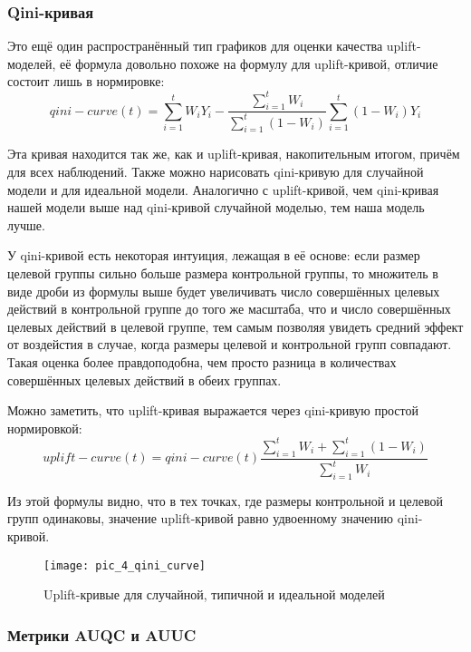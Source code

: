 \subsubsection*{Qini-кривая}

Это ещё один распространённый тип графиков для оценки качества uplift-моделей, её формула довольно похоже на формулу для uplift-кривой, отличие состоит лишь в нормировке:
$$
    qini-curve(t) =
        \sum\limits_{i=1}^{t} W_i Y_i
        - 
        \frac{
            \sum\limits_{i=1}^{t} W_i
        }{
            \sum\limits_{i=1}^{t} (1 - W_i)
        }
        \sum\limits_{i=1}^{t} (1 - W_i) Y_i
$$

Эта кривая находится так же, как и uplift-кривая, накопительным итогом, причём для всех наблюдений. Также можно нарисовать qini-кривую для случайной модели и для идеальной модели. Аналогично с uplift-кривой, чем qini-кривая нашей модели выше над qini-кривой случайной моделью, тем наша модель лучше.

У qini-кривой есть некоторая интуиция, лежащая в её основе: если размер целевой группы сильно больше размера контрольной группы, то множитель в виде дроби из формулы выше будет увеличивать число совершённых целевых действий в контрольной группе до того же масштаба, что и число совершённых целевых действий в целевой группе, тем самым позволяя увидеть средний эффект от воздейстия в случае, когда размеры целевой и контрольной групп совпадают. Такая оценка более правдоподобна, чем просто разница в количествах совершённых целевых действий в обеих группах.

Можно заметить, что uplift-кривая выражается через qini-кривую простой нормировкой:
$$
    uplift-curve(t) = qini-curve(t) \frac{
        \sum\limits_{i=1}^{t} W_i
        +
        \sum\limits_{i=1}^{t} (1 - W_i)
    }{
        \sum\limits_{i=1}^{t} W_i
    }
$$

Из этой формулы видно, что в тех точках, где размеры контрольной и целевой групп одинаковы, значение uplift-кривой равно удвоенному значению qini-кривой. 

\begin{figure}[ht]
\centering
\texttt{[image: pic\_4\_qini\_curve]}
\centering
\caption{Uplift-кривые для случайной, типичной и идеальной моделей}
\label{fig:pic_4_qini_curve}
\end{figure}


\subsubsection*{Метрики AUQC и AUUC}

